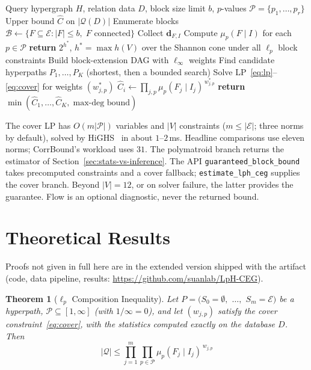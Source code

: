 \documentclass[sigconf, nonacm, acmthm=false]{acmart}
\newcommand{\query}{\mathcal{Q}}
\newcommand{\block}{F}
\newcommand{\interface}{I}
\newcommand{\joinstate}{S}
\newcommand{\muLp}[3]{\mu_{#1}(#2 \mid #3)}
\newtheorem{theorem}{Theorem}
\begin{document}
\begin{algorithm}[t]
\caption{LpH-CEG Estimation}
\label{alg:lph-ceg}
\begin{algorithmic}[1]
\REQUIRE Query hypergraph $H$, relation data $D$, block size limit $b$,
  $p$-values $\mathcal{P} = \{p_1, \ldots, p_r\}$
\ENSURE Upper bound $\hat{C}$ on $|\query(D)|$
\STATE Enumerate blocks $\mathcal{B} \gets \{F \subseteq \mathcal{E} :
  |F| \le b,\; F \text{ connected}\}$
  \STATE Collect $\mathbf{d}_{F,I}$ 
  \STATE Compute $\muLp{p}{F}{I}$ for each $p \in \mathcal{P}$
\ENDFOR
{}
  \STATE \textbf{return} $2^{h^*}$, $h^* = \max h(V)$ over the Shannon cone under all $\ell_p$ block constraints
\ENDIF
\STATE Build block-extension DAG with $\ell_\infty$ weights
\STATE Find candidate hyperpaths $P_1, \ldots, P_K$ (shortest, then a bounded search) 
  \STATE Solve LP~\eqref{eq:lp}--\eqref{eq:cover} for weights $(w^*_{j,p})$
  \STATE $\hat{C}_i \gets \prod_{j,p} \muLp{p}{F_j}{I_j}^{\,w^*_{j,p}}$
\ENDFOR
\STATE \textbf{return} $\min(\hat{C}_1, \ldots, \hat{C}_K,\; \text{max-deg bound})$
\end{algorithmic}
\end{algorithm}

The cover LP has $O(m|\mathcal{P}|)$ variables and $|V|$ constraints ($m\le|\mathcal{E}|$; three norms by default), solved by HiGHS~\cite{huangfu2018highs} in about $1$--$2$\,ms. Headline comparisons use eleven norms; CorrBound's workload uses $31$. The polymatroid branch returns the estimator of Section~\ref{sec:stats-vs-inference}. The API \texttt{guaranteed\_block\_bound} takes precomputed constraints and a cover fallback; \texttt{estimate\_lph\_ceg} supplies the cover branch. Beyond $|V|{=}12$, or on solver failure, the latter provides the guarantee. Flow is an optional diagnostic, never the returned bound.

\section{Theoretical Results}
\label{sec:theory}
Proofs not given in full here are in the extended version shipped with
the artifact (code, data pipeline, results:
\url{https://github.com/suanlab/LpH-CEG}).

\begin{theorem}[$\ell_p$ Composition Inequality]
\label{thm:composition}
Let $P = (\joinstate_0{=}\emptyset,$ $\ldots,$ $\joinstate_m{=}\mathcal{E})$
be a hyperpath, $\mathcal{P}\subseteq[1,\infty]$ (with $1/\infty{=}0$), and
let $(w_{j,p})$ satisfy the cover constraint~\eqref{eq:cover}, with the
statistics computed exactly on the database $D$. Then
\[
|\query| \le \prod_{j=1}^{m} \prod_{p \in \mathcal{P}}
\muLp{p}{\block_j}{\interface_j}^{\,w_{j,p}}
\]
\end{theorem}
\end{document}
